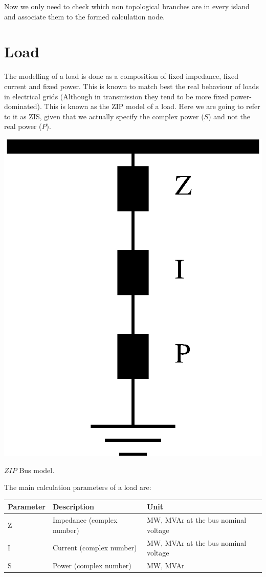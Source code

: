\documentclass[nols,a4paper,twoside,notoc,fleqn]{tufte-book}
\begin{document}
Now we only need to check which non topological branches are in every island and associate them to the formed calculation node.

\section{Load}

The modelling of a load is done as a composition of fixed impedance, fixed current and fixed power. This is known to match best the real behaviour of loads in electrical grids (Although in transmission they tend to be more fixed power-dominated). This is known as the ZIP model of a load. Here we are going to refer to it as ZIS, given that we actually specify the complex power ($S$) and not the real power ($P$).

\begin{marginfigure}
	\includegraphics[width=0.49\linewidth]{img/ZIP_model.eps}
	\caption{$ZIP$ Bus model.}
	\label{zip_bus_model}
\end{marginfigure}

The main calculation parameters of a load are:\\
\begin{tabular}{|l|p{3cm}|p{4cm}|}
	\hline 
	Parameter & Description & Unit \\ 
	\hline 
	Z & Impedance (complex number) & MW, MVAr at the bus nominal voltage \\ 
	\hline 
	I & Current (complex number) & MW, MVAr at the bus nominal voltage \\ 
	\hline 
	S & Power (complex number) & MW, MVAr \\ 
	\hline
\end{tabular} 

\vspace{0.5cm}
\end{document}

